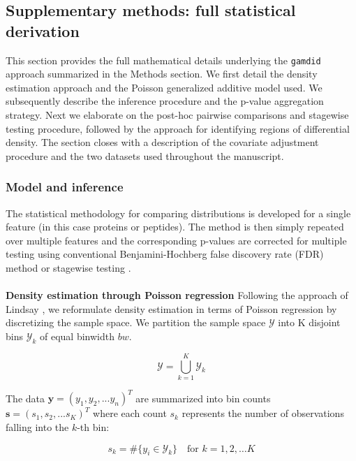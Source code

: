\subsection{Supplementary methods: full statistical derivation} \label{suppl_methods}

This section provides the full mathematical details underlying the \texttt{gamdid} approach summarized in the Methods section. We first detail the density estimation approach and the Poisson generalized additive model used. We subsequently describe the inference procedure and the p-value aggregation strategy. Next we elaborate on the post-hoc pairwise comparisons and stagewise testing procedure, followed by the approach for identifying regions of differential density. The section closes with a description of the covariate adjustment procedure and the two datasets used throughout the manuscript.

\subsubsection{Model and inference}

The statistical methodology for comparing distributions is developed for a single feature (in this case proteins or peptides). The method is then simply repeated over multiple features and the corresponding p-values are corrected for multiple testing using conventional Benjamini-Hochberg false discovery rate (FDR) method \cite{BH_procedure} or stagewise testing \cite{stagewise_testing}.
\\
\\
\textbf{Density estimation through Poisson regression} Following the approach of Lindsay \cite{lindsay_method}, we reformulate density estimation in terms of Poisson regression by discretizing the sample space. We partition the sample space $\mathscr{Y}$ into K disjoint bins $\mathscr{Y}_k$ of equal binwidth $bw$.

\begin{equation}
	\mathscr{Y} =\bigcup_{k=1}^K \mathscr{Y}_k
	\label{eq:discr}
\end{equation}

The data $\boldsymbol{y} = (y_1,y_2, ... y_n)^T$ are summarized into bin counts $\boldsymbol{s} = (s_1,s_2, ... s_K)^T$ where each count $s_k$ represents the number of observations falling into the $k$-th bin:

\begin{equation}
    s_k = \# \{ y_i \in \mathscr{Y}_k \}\quad 
    \text{for } k=1,2, \ldots K
	\label{eq:binning}
\end{equation}

